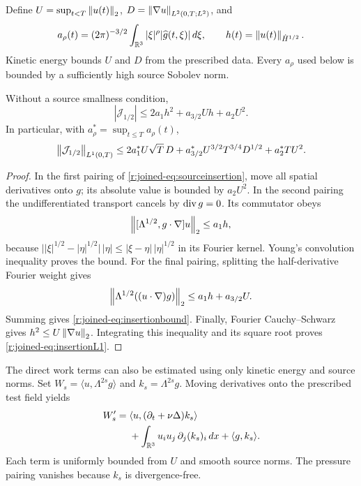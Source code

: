Define $U=\sup_{t<T}\left\lVert u(t)\right\rVert_2$,
$D=\left\lVert \nabla u\right\rVert_{L^2(0,T;L^2)}$, and
\begin{equation*}
a_\rho(t)=(2\pi)^{-3/2}\int_{\mathbb R^3}|\xi|^\rho
|\widehat g(t,\xi)|\,d\xi,\qquad
h(t)=\left\lVert u(t)\right\rVert_{\dot H^{1/2}}.
\end{equation*}
Kinetic energy bounds $U$ and $D$ from the prescribed data. Every $a_\rho$ used below is bounded by a sufficiently high source Sobolev norm.

\begin{proposition}\label{r:joined-prop:sourceinsertion}
Without a source smallness condition,
\begin{equation}\label{r:joined-eq:insertionbound}
|\mathcal J_{1/2}|\le
2a_1h^2+a_{3/2}Uh+a_2U^2.
\end{equation}
In particular, with $a_\rho^*=\sup_{t\le T}a_\rho(t)$,
\begin{equation}\label{r:joined-eq:insertionL1}
\left\lVert \mathcal J_{1/2}\right\rVert_{L^1(0,T)}
\le2a_1^*U\sqrt T\,D
+a_{3/2}^*U^{3/2}T^{3/4}D^{1/2}
+a_2^*TU^2.
\end{equation}
\end{proposition}
\begin{proof}
In the first pairing of \eqref{r:joined-eq:sourceinsertion}, move all spatial derivatives onto $g$; its absolute value is bounded by $a_2U^2$.
In the second pairing the undifferentiated transport cancels by $\operatorname{div} g=0$. Its commutator obeys
\begin{equation*}
\left\lVert [\Lambda^{1/2},g\cdot\nabla]u\right\rVert_2\le a_1h,
\end{equation*}
because
$\bigl||\xi|^{1/2}-|\eta|^{1/2}\bigr|\,|\eta|
\le|\xi-\eta|\,|\eta|^{1/2}$
in its Fourier kernel. Young's convolution inequality proves the bound.
For the final pairing, splitting the half-derivative Fourier weight gives
\begin{equation*}
\left\lVert \Lambda^{1/2}((u\cdot\nabla)g)\right\rVert_2
\le a_1h+a_{3/2}U.
\end{equation*}
Summing gives \eqref{r:joined-eq:insertionbound}. Finally, Fourier Cauchy--Schwarz gives $h^2\le U\left\lVert \nabla u\right\rVert_2$. Integrating this inequality and its square root proves \eqref{r:joined-eq:insertionL1}.
\end{proof}

The direct work terms can also be estimated using only kinetic energy and source norms. Set
$W_s=\langle u,\Lambda^{2s}g\rangle$ and $k_s=\Lambda^{2s}g$.
Moving derivatives onto the prescribed test field yields
\begin{equation}\label{r:joined-eq:workderivative}
\begin{aligned}
W_s'={}&\langle u,(\partial_t+\nu\Delta)k_s\rangle\\
&+\int_{\mathbb R^3}u_i u_j\,\partial_j(k_s)_i\,dx
+\langle g,k_s\rangle .
\end{aligned}
\end{equation}
Each term is uniformly bounded from $U$ and smooth source norms. The pressure pairing vanishes because $k_s$ is divergence-free.


